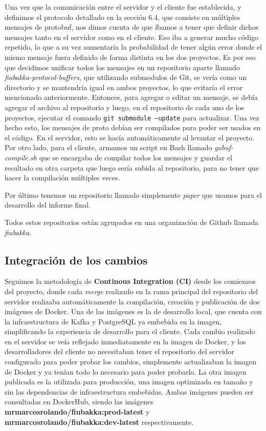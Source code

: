 Una vez que la comunicación entre el servidor y el cliente fue establecida, y definimos el protocolo detallado en la sección 6.4, que consiste en
múltiples mensajes de protobuf, nos dimos cuenta de que íbamos a tener que definir dichos mensajes tanto en el servidor como en el cliente. Eso iba
a generar mucho código repetido, lo que a su vez aumentaría la probabilidad de tener algún error donde el mismo mensaje fuera definido de
forma distinta en los dos proyectos. Es por eso que decidimos unificar todos los mensajes en un repositorio aparte llamado \textit{fiubakka-protocol-buffers}, que utilizando submodulos
de Git, se vería como un directorio y se mantendría igual en ambos proyectos, lo que evitaría el error mencionado anteriormente.
Entonces, para agregar o editar un mensaje, se debía agregar el archivo al repositorio y luego, en el repositorio de cada uno de los proyectos, 
ejecutar el comando \texttt{git submodule --update} para actualizar. Una vez hecho esto, los mensajes de proto debían ser compilados para poder
ser usados en el código. En el servidor, esto se hacía automáticamente al levantar el proyecto. Por otro lado, para el cliente, armamos un
script en Bash llamado \textit{gobuf-compile.sh} que se encargaba de compilar todos los mensajes y guardar el resultado en otra carpeta que 
luego sería subida al repositorio, para no tener que hacer la compilación múltiples veces.

Por último tenemos un repositorio llamado simplemente \textit{paper} que usamos para el desarrollo del informe final.

Todos estos repositorios están agrupados en una organización de Github llamada \textit{fiubakka}.

\subsection{Integración de los cambios}

\noindent Seguimos la metodología de \textbf{Continous Integration (CI)} desde los comienzos del proyecto, donde cada \textit{merge} realizado en la rama principal
del repositorio del servidor realizaba automáticamente la compilación, creación y publicación de dos imágenes de Docker. Una de las imágenes es la de desarrollo local, que cuenta
con la infraestructura de Kafka y PostgreSQL ya embebida en la imagen, simplificando la experiencia de desarrollo para el cliente. Cada cambio realizado en el servidor se veía reflejado
inmediatamente en la imagen de Docker, y los desarrolladores del cliente no necesitaban tener el repositorio del servidor configurado para poder probar los cambios, simplemente actualizaban la
imagen de Docker y ya tenían todo lo necesario para poder probarlo. La otra imagen publicada es la utilizada para producción, una imagen optimizada en tamaño y sin las dependencias de infraestructura
embebidas. Ambas imágenes pueden ser consultadas en DockerHub, siendo las imágenes \textbf{mrmarcosrolando/fiubakka:prod-latest} y \textbf{mrmarcosrolando/fiubakka:dev-latest} respectivamente.

